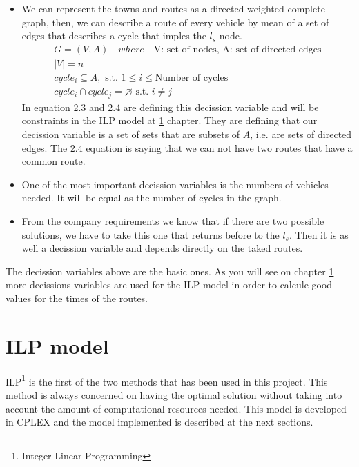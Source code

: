 \documentclass[]{report}
\begin{document}
\begin{itemize}
	\item We can represent the towns and routes as a directed weighted complete graph, then, we can describe a route of every vehicle by mean of a set of edges that describes a cycle that imples the $l_{s}$ node. 
	\begin{gather}
	G=(V,A) \quad where \quad \text{V: set of nodes, A: set of directed edges} \\
	|V|=n \\
	cycle_{i} \subseteq A, \text{ s.t. } 1 \leq i \leq \text{Number of cycles} \\
	cycle_{i} \cap cycle_{j} = \varnothing \text{ s.t. } i \neq j
	\end{gather}
	In equation 2.3 and 2.4 are defining this decission variable and will be constraints in the ILP model at \ref{ch:ilp_model} chapter. They are defining that our decission variable is a set of sets that are subsets of $A$, i.e. are sets of directed edges. The 2.4 equation is saying that we can not have two routes that have a common route.
	
	\item One of the most important decission variables is the numbers of vehicles needed. It will be equal as the number of cycles in the graph.
	
	\item From the company requirements we know that if there are two possible solutions, we have to take this one that returns before to the $l_{s}$. Then it is as well a decission variable and depends directly on the taked routes.
\end{itemize}

The decission variables above are the basic ones. As you will see on chapter \ref{ch:ilp_model} more decissions variables are used for the ILP model in order to calcule good values for the times of the routes.

\chapter{ILP model}\label{ch:ilp_model}

ILP\footnote{Integer Linear Programming} is the first of the two methods that has been used in this project. This method is always concerned on having the optimal solution without taking into account the amount of computational resources needed. This model is developed in CPLEX and the model implemented is described at the next sections.
\end{document}
